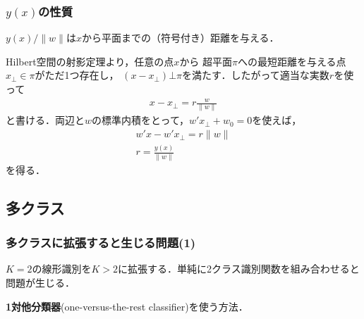 \documentclass[10pt,%
hyperref={unicode}]{beamer}
\makeatletter
\renewenvironment{proof}{\par%
\pushQED{\qed}\normalfont\topsep6\p@\@plus6\p@\relax\trivlist%
\item[\hskip\labelsep{\bfseries 証明}\hskip\labelsep]\ignorespaces}{\popQED\endtrivlist\@endpefalse}
\makeatother
\begin{document}
\begin{frame}
    \frametitle{$y(x)$の性質}
    $y(x)/\|w\|$は$x$から平面までの（符号付き）距離を与える．

    \bigskip

    \begin{proof}Hilbert空間の射影定理より，任意の点$x$から
    超平面$\pi$への最短距離を与える点$x_\bot \in \pi$がただ1つ存在し，
    $(x - x_\bot) \bot \pi$を満たす．したがって適当な実数$r$を使って
    \begin{align*}
        x - x_\bot = r \frac{w}{\|w\|}
    \end{align*}
    と書ける．両辺と$w$の標準内積をとって，$w' x_\bot + w_0 = 0$を使えば，
    \begin{gather*}
        w' x - w' x_\bot = r\|w\| \\
        r = \frac{y(x)}{\|w\|}
    \end{gather*}
    を得る．\end{proof}

\end{frame}

\subsection{多クラス}
\begin{frame}
    \frametitle{多クラスに拡張すると生じる問題(1)}
    $K = 2$の線形識別を$K > 2$に拡張する．単純に2クラス識別関数を組み合わせると
    問題が生じる．

    \bigskip

    \textbf{1対他分類器}(one-versus-the-rest classifier)を使う方法．

    \smallskip

    \begin{center}
    \end{center}
\end{frame}
\end{document}
